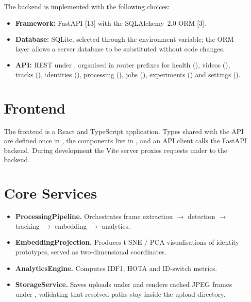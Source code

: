 The backend is implemented with the following choices:

\begin{itemize}
  \item \textbf{Framework:} FastAPI [13] with the SQLAlchemy~2.0 ORM [3].
  \item \textbf{Database:} SQLite, selected through the  environment variable; the ORM layer allows a server database to be substituted without code changes.
  \item \textbf{API:} REST under , organised in router prefixes for health (), videos (), tracks (), identities (), processing (), jobs (), experiments () and settings ().
\end{itemize}

\section{Frontend}

The frontend is a React and TypeScript application. Types shared with the API are defined once in , the components live in , and an API client calls the FastAPI backend. During development the Vite server proxies requests under  to the backend.

\section{Core Services}

\begin{itemize}
  \item \textbf{ProcessingPipeline.} Orchestrates frame extraction $\rightarrow$ detection $\rightarrow$ tracking $\rightarrow$ embedding $\rightarrow$ analytics.
  \item \textbf{EmbeddingProjection.} Produces t-SNE / PCA visualisations of identity prototypes, served as two-dimensional coordinates.
  \item \textbf{AnalyticsEngine.} Computes IDF1, HOTA and ID-switch metrics.
  \item \textbf{StorageService.} Saves uploads under  and renders cached JPEG frames under , validating that resolved paths stay inside the upload directory.
\end{itemize}


